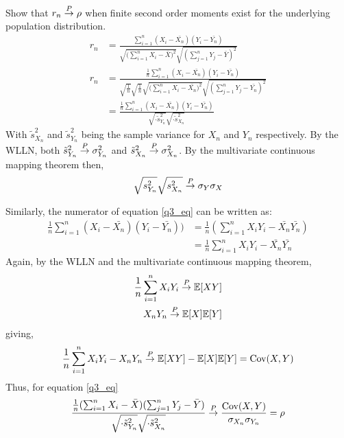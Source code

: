 Show that $r_n \overset{P}{\rightarrow} \rho$ when finite second order moments exist for the underlying population distribution.
\begin{align}
    \label{q3_eq}
  \nonumber  r_n &= \frac{\sum_{i=1}^n( X_i - \bar{X_n})( Y_i - \bar{Y_n})}{\sqrt{\big(\sum_{i=1}^n X_i - \bar{X}\big)^2}\sqrt{(\sum_{j=1}^n Y_j - \bar{Y})^2}}\\
  \nonumber  r_n &= \frac{\frac{1}{n}\sum_{i=1}^n( X_i - \bar{X_n})( Y_i - \bar{Y_n})}
                    {\sqrt{\frac{1}{n}}\sqrt{\frac{1}{n}}\sqrt{\big(\sum_{i=1}^n X_i - \bar{X_n}\big)^2}\sqrt{(\sum_{j=1}^n Y_j - \bar{Y_n})^2}}\\
        &= \frac{\frac{1}{n}\sum_{i=1}^n(X_i - \bar{X_n})(Y_i - \bar{Y_n})}{\sqrt{\cdot\tilde{s}^2_{Y_n}}\sqrt{\cdot\tilde{s}^2_{X_n}}}
\end{align}
With  $\tilde{s}^2_{X_n}$ and $\tilde{s}^2_{Y_n}$ being the sample variance for $X_n$ and $Y_n$ respectively.
By the WLLN, both $\tilde{s}^2_{Y_n} \overset{P}{\rightarrow} \sigma^2_{Y_n}$ and $\tilde{s}^2_{X_n}\overset{P}{\rightarrow} \sigma^2_{X_n}$.
By the multivariate continuous mapping theorem then, 
\begin{equation*}
    \sqrt{s^2_{Y_n}}\sqrt{s^2_{X_n}} \overset{P}{\rightarrow} \sigma_Y\sigma_X
\end{equation*}

Similarly, the numerator of equation \ref{q3_eq} can be written as:
\begin{align*}
    \frac{1}{n}\sum_{i=1}^n( X_i - \bar{X_n})(Y_i - \bar{Y_n})) &= \frac{1}{n}(\sum_{i=1}^n X_iY_i - \bar{X_n}\bar{Y_n})\\
                                                                            &=\frac{1}{n}\sum_{i=1}^n X_iY_i - \bar{X_n}\bar{Y_n}
\end{align*}
Again, by the WLLN and the multivariate continuous mapping theorem, 
\begin{align*}
    \frac{1}{n}\sum_{i=1}^n X_iY_i \overset{P}{\rightarrow} \mathbb{E}[XY]\\
    X_nY_n \overset{P}{\rightarrow} \mathbb{E}[X]\mathbb{E}[Y]\\
\end{align*}
giving,
\begin{align*}
    \frac{1}{n}\sum_{i=1}^n X_iY_i - X_nY_n \overset{P}{\rightarrow} \mathbb{E}[XY]-\mathbb{E}[X]\mathbb{E}[Y] = \text{Cov}(X, Y)\\
\end{align*}
Thus, for equation \ref{q3_eq}
\begin{align*}
    \frac{\frac{1}{n}(\sum_{i=1}^n X_i - \bar{X})(\sum_{j=1}^n Y_j - \bar{Y})}{\sqrt{\cdot\tilde{s}^2_{Y_n}}\sqrt{\cdot\tilde{s}^2_{X_n}}} \overset{P}{\rightarrow}
    \frac{\text{Cov}(X, Y)}{\sigma_{X_n}\sigma_{Y_n}} = \rho
\end{align*}


